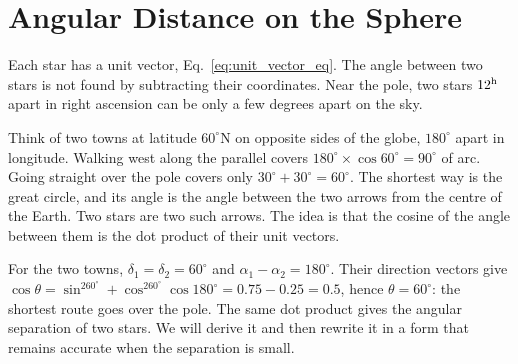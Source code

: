 \section{Angular Distance on the Sphere}
\label{co:sec:angdist}

Each star has a unit vector, Eq.~\eqref{eq:unit_vector_eq}. The angle between two stars is not found by subtracting their coordinates. Near the pole, two stars $12^{\rm h}$ apart in right ascension can be only a few degrees apart on the sky.

Think of two towns at latitude $60^\circ\mathrm N$ on opposite sides of the globe, $180^\circ$ apart in longitude. Walking west along the parallel covers $180^\circ\times\cos60^\circ=90^\circ$ of arc. Going straight over the pole covers only $30^\circ+30^\circ=60^\circ$. The shortest way is the great circle, and its angle is the angle between the two arrows from the centre of the Earth. Two stars are two such arrows. The idea is that the cosine of the angle between them is the dot product of their unit vectors.

For the two towns, $\delta_1=\delta_2=60^\circ$ and $\alpha_1-\alpha_2=180^\circ$. Their direction vectors give $\cos\theta=\sin^260^\circ+\cos^260^\circ\cos180^\circ=0.75-0.25=0.5$, hence $\theta=60^\circ$: the shortest route goes over the pole. The same dot product gives the angular separation of two stars. We will derive it and then rewrite it in a form that remains accurate when the separation is small.

